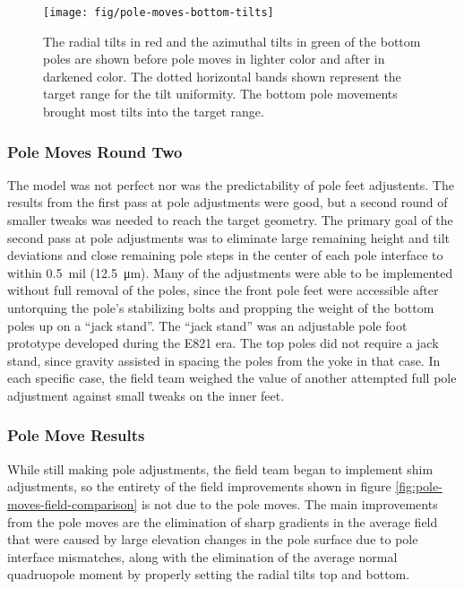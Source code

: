 \begin{figure}
\centering
\texttt{[image: fig/pole-moves-bottom-tilts]}
\caption{
    The radial tilts in red and the azimuthal tilts in green of the bottom poles are shown before pole moves in lighter color and after in darkened color.  The dotted horizontal bands shown represent the target range for the tilt uniformity.  The bottom pole movements brought most tilts into the target range. 
    \label{fig:pole-moves-bottom-tilts}
}
\end{figure}

\subsubsection{Pole Moves Round Two}

The model was not perfect nor was the predictability of pole feet adjustents.  The results from the first pass at pole adjustments were good, but a second round of smaller tweaks was needed to reach the target geometry.  The primary goal of the second pass at pole adjustments was to eliminate large remaining height and tilt deviations and close remaining pole steps in the center of each pole interface to within \SI{0.5}{mil} (\SI{12.5}{\micro\meter}).  Many of the adjustments were able to be implemented without full removal of the poles, since the front pole feet were accessible after untorquing the pole's stabilizing bolts and propping the weight of the bottom poles up on a ``jack stand''.  The ``jack stand'' was an adjustable pole foot prototype developed during the E821 era.  The top poles did not require a jack stand, since gravity assisted in spacing the poles from the yoke in that case.  In each specific case, the field team weighed the value of another attempted full pole adjustment against small tweaks on the inner feet.

\subsubsection{Pole Move Results}

While still making pole adjustments, the field team began to implement shim adjustments, so the entirety of the field improvements shown in figure \ref{fig:pole-moves-field-comparison} is not due to the pole moves.  The main improvements from the pole moves are the elimination of sharp gradients in the average field that were caused by large elevation changes in the pole surface due to pole interface mismatches, along with the elimination of the average normal quadruopole moment by properly setting the radial tilts top and bottom.

